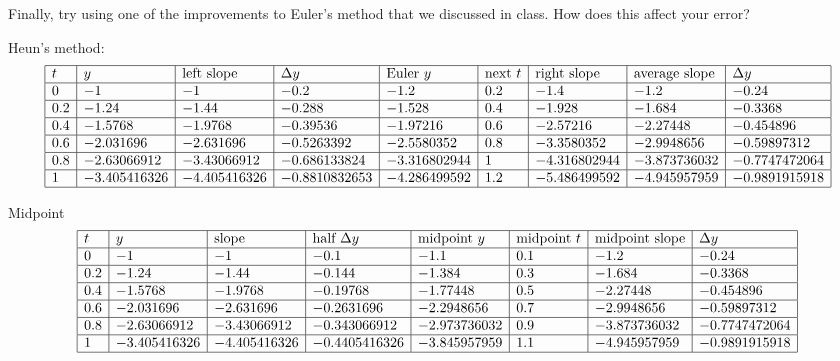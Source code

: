 \begin{landscape}

    Finally, try using one of the improvements to Euler's method that we discussed in class. How does this affect your error?

\begin{red}

Heun's method:
\[
    \begin{array}{|l|l|l|l|l|l|l|l|l|} \hline
        t & y & \text{left slope}   & \Delta y   & \text{Euler }y      & \text{next }t & \text{right slope}  & \text{average slope}    & \Delta y       \\\hline
        0         & -1           & -1           & -0.2          & -1.2         & 0.2    & -1.4         & -1.2         & -0.24         \\\hline
        0.2       & -1.24        & -1.44        & -0.288        & -1.528       & 0.4    & -1.928       & -1.684       & -0.3368       \\\hline
        0.4       & -1.5768      & -1.9768      & -0.39536      & -1.97216     & 0.6    & -2.57216     & -2.27448     & -0.454896     \\\hline
        0.6       & -2.031696    & -2.631696    & -0.5263392    & -2.5580352   & 0.8    & -3.3580352   & -2.9948656   & -0.59897312   \\\hline
        0.8       & -2.63066912  & -3.43066912  & -0.686133824  & -3.316802944 & 1      & -4.316802944 & -3.873736032 & -0.7747472064 \\\hline
        1         & -3.405416326 & -4.405416326 & -0.8810832653 & -4.286499592 & 1.2    & -5.486499592 & -4.945957959 & -0.9891915918 \\\hline
    \end{array}
\]

Midpoint
\[
    \begin{array}{|l|l|l|l|l|l|l|l|}
        \hline
        t & y    & \text{slope}        & \text{half }\Delta y  & \text{midpoint }y     & \text{midpoint }t & \text{midpoint slope} & \Delta y       \\ \hline
        0         & -1           & -1           & -0.1          & -1.1         & 0.1      & -1.2         & -0.24         \\ \hline
        0.2       & -1.24        & -1.44        & -0.144        & -1.384       & 0.3      & -1.684       & -0.3368       \\ \hline
        0.4       & -1.5768      & -1.9768      & -0.19768      & -1.77448     & 0.5      & -2.27448     & -0.454896     \\ \hline
        0.6       & -2.031696    & -2.631696    & -0.2631696    & -2.2948656   & 0.7      & -2.9948656   & -0.59897312   \\ \hline
        0.8       & -2.63066912  & -3.43066912  & -0.343066912  & -2.973736032 & 0.9      & -3.873736032 & -0.7747472064 \\ \hline
        1         & -3.405416326 & -4.405416326 & -0.4405416326 & -3.845957959 & 1.1      & -4.945957959 & -0.9891915918 \\ \hline
    \end{array}
\]


\end{red}
\end{landscape}
